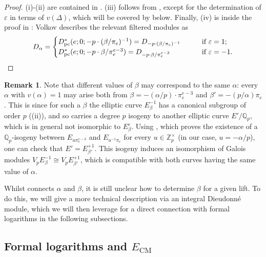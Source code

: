 \documentclass{amsart}
\newcommand{\Qp}{\mathbb{Q}_p}
\theoremstyle{definition}
\newtheorem{remark}[theorem]{Remark}
\newcommand{\Q}{\mathbb{Q}}
\numberwithin{theorem}{section}
\numberwithin{equation}{section}
\begin{document}
\begin{proof}
(i)-(ii) are contained in \cite[Proposition 6 on p.~91]{Volkov}. (iii) follows from \cite[p.~92, Remarque 1]{Volkov}, except for the determination of $\varepsilon$ in terms of $v(\Delta)$, which will be covered by  below. Finally, (iv) is inside the proof in \cite[p.~95]{Volkov}: Volkov describes the relevant filtered modules as 
\[
D_\alpha = \begin{cases}
        D_{\operatorname{pc}}^*(e; 0; -p \cdot (\beta/\pi_e)^{-1}) = D_{-p \cdot (\beta/\pi_e)^{-1}} & \qquad \text{if } \varepsilon=1; \\
        D_{\operatorname{pc}}^*(e; 0; -p \cdot \beta/\pi_e^{e-3}) = D_{-p \cdot \beta/\pi_e^{e-3}} &  \qquad \text{if } \varepsilon=-1. \qedhere
    \end{cases}
\]
\end{proof}

\begin{remark}\label{uniqueness of alpha beta}
Note that different values of $\beta$ may correspond to the same $\alpha$: every $\alpha$ with $v(\alpha)=1$ may arise both from $\beta=-(\alpha/p) \cdot \pi_e^{e-3}$ and $\beta'=-(p/\alpha) \pi_e$. This is since for such a $\beta$ the elliptic curve $E_\beta^{-1}$ has a canonical subgroup of order $p$ ((ii)), and so carries a degree $p$ isogeny to another elliptic curve $E'/\Q_p$, which is in general not isomorphic to $E_\beta^\varepsilon$. Using \cite[Remarque~2, p.~93]{Volkov}, which proves the existence of a $\Qp$-isogeny between $E_{u \pi_{e}^{e-3}}$ and $E_{u^{-1} \pi_e}$ for every $u \in \mathbb{Z}_p^\times$ (in our case, $u=-\alpha/p$), one can check that $E' = E_{\beta'}^{+1}$. This isogeny induces an isomorphism of Galois modules $V_pE^{-1}_\beta \cong V_pE^{+1}_{\beta'}$, which is compatible with both curves having the same value of $\alpha$. 
\end{remark}

Whilst  connects $\alpha$ and $\beta$, it is still unclear how to determine $\beta$ for a given lift. To do this, we will give a more technical description via an integral Dieudonn\'{e} module, which we will then leverage for a direct connection with formal logarithms in the following subsections.


\subsection{Formal logarithms and $E_{\mathrm{CM}}$}
\end{document}
